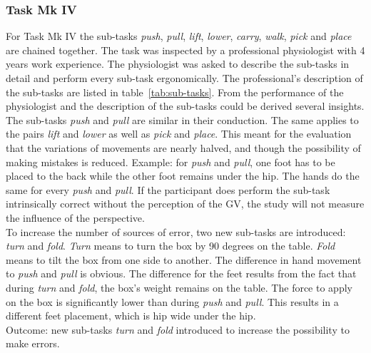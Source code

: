 \subsubsection{Task Mk IV}
For Task Mk IV the sub-tasks \textit{push}, \textit{pull}, \textit{lift}, \textit{lower}, \textit{carry}, \textit{walk}, \textit{pick} and \textit{place} are chained together. The task was inspected by a professional physiologist with 4 years work experience. The physiologist was asked to describe the sub-tasks in detail and perform every sub-task ergonomically. The professional's description of the sub-tasks are listed in table~\ref{tab:sub-tasks}. From the performance of the physiologist and the description of the sub-tasks could be derived several insights. The sub-tasks \textit{push} and \textit{pull} are similar in their conduction. The same applies to the pairs \textit{lift} and \textit{lower} as well as \textit{pick} and \textit{place}. This meant for the evaluation that the variations of movements are nearly halved, and though the possibility of making mistakes is reduced. Example: for \textit{push} and \textit{pull}, one foot has to be placed to the back while the other foot remains under the hip. The hands do the same for every \textit{push} and \textit{pull}. If the participant does perform the sub-task intrinsically correct without the perception of the GV, the study will not measure the influence of the perspective.\\
To increase the number of sources of error, two new sub-tasks are introduced: \textit{turn} and \textit{fold}. \textit{Turn} means to turn the box by 90 degrees on the table. \textit{Fold} means to tilt the box from one side to another. The difference in hand movement to \textit{push} and \textit{pull} is obvious. The difference for the feet results from the fact that during \textit{turn} and \textit{fold}, the box's weight remains on the table. The force to apply on the box is significantly lower than during \textit{push} and \textit{pull}. This results in a different feet placement, which is hip wide under the hip.\\
Outcome: new sub-tasks \textit{turn} and \textit{fold} introduced to increase the possibility to make errors.

